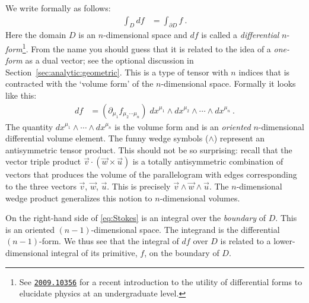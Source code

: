 We write formally as follows:
\begin{align}
  \int_D df &= \int_{\partial D} f \ .
\end{align}
Here the domain $D$ is an $n$-dimensional space and $df$ is called a \emph{differential} $n$-\emph{form}\footnote{See \texttt{\href{https://arxiv.org/abs/2009.10356}{2009.10356}} for a recent introduction to the utility of differential forms to elucidate physics at an undergraduate level.}. From the name you should guess that it is related to the idea of a \emph{one-form} as a dual vector; see the optional discussion in Section~\ref{sec:analytic:geometric}.  This is a type of tensor with $n$ indices that is contracted with the `volume form' of the $n$-dimensional space. Formally it looks like this:
\begin{align}
  df &= (\partial_{\mu_1} f_{\mu_2\cdots \mu_n}) \; dx^{\mu_1}\wedge dx^{\mu_2}\wedge\cdots\wedge dx^{\mu_n} \ .
  \label{eq:Stokes}
\end{align}
The quantity $dx^{\mu_1}\wedge\cdots\wedge dx^{\mu_n}$ is the volume form and is an \emph{oriented} $n$-dimensional differential volume element. The funny wedge symbols ($\wedge$) represent an antisymmetric tensor product. This should not be so surprising: recall that the vector triple product $\vec{v}\cdot\left(\vec{w}\times\vec{u}\right)$ is a totally antisymmetric combination of vectors that produces the volume of the parallelogram with edges corresponding to the three vectors $\vec{v}$, $\vec{w}$, $\vec{u}$. This is precisely $\vec{v}\wedge\vec{w}\wedge\vec{u}$. The $n$-dimensional wedge product generalizes this notion to $n$-dimensional volumes. 

On the right-hand side of \eqref{eq:Stokes} is an integral over the \emph{boundary} of $D$. This is an oriented $(n-1)$-dimensional space. The integrand is the differential $(n-1)$-form. We thus see that the integral of $df$ over $D$ is related to a lower-dimensional integral of its primitive, $f$, on the boundary of $D$. 


